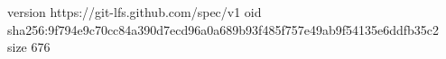 version https://git-lfs.github.com/spec/v1
oid sha256:9f794e9c70cc84a390d7ecd96a0a689b93f485f757e49ab9f54135e6ddfb35c2
size 676
